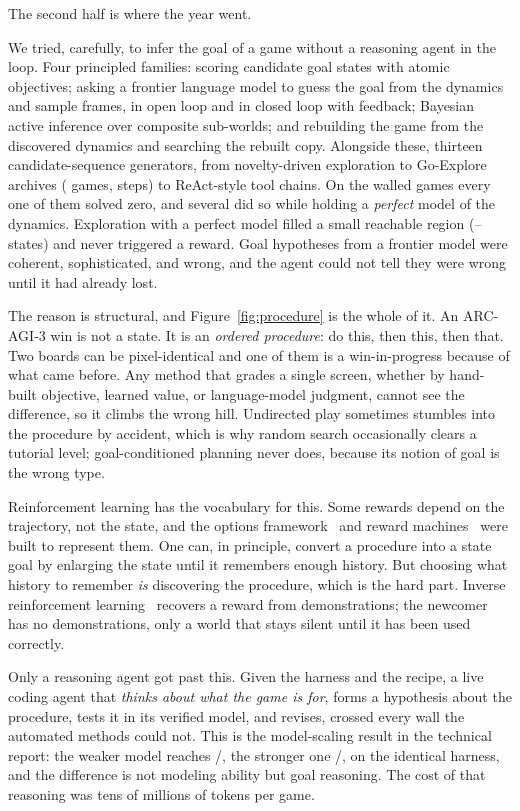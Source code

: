\documentclass[11pt]{article}
\begin{document}
The second half is where the year went.

We tried, carefully, to infer the goal of a game without a reasoning agent in the loop. Four principled
families: scoring candidate goal states with atomic objectives; asking a frontier language model to guess
the goal from the dynamics and sample frames, in open loop and in closed loop with feedback; Bayesian
active inference over composite sub-worlds; and rebuilding the game from the discovered dynamics and
searching the rebuilt copy. Alongside these, thirteen candidate-sequence generators, from novelty-driven
exploration to Go-Explore archives (\ArcGoExploreN{} games, \ArcGoExploreSteps{} steps) to ReAct-style
tool chains. On the walled games every one of them solved zero, and several did so while holding a
\emph{perfect} model of the dynamics. Exploration with a perfect model filled a small reachable region
(\ArcExploreLo{}--\ArcExploreHi{} states) and never triggered a reward. Goal hypotheses from a frontier
model were coherent, sophisticated, and wrong, and the agent could not tell they were wrong until it had
already lost.

The reason is structural, and Figure~\ref{fig:procedure} is the whole of it. An ARC-AGI-3 win is not a
state. It is an \emph{ordered procedure}: do this, then this, then that. Two boards can be pixel-identical
and one of them is a win-in-progress because of what came before. Any method that grades a single screen,
whether by hand-built objective, learned value, or language-model judgment, cannot see the difference,
so it climbs the wrong hill. Undirected play sometimes stumbles into the procedure by accident, which is
why random search occasionally clears a tutorial level; goal-conditioned planning never does, because its
notion of goal is the wrong type.

Reinforcement learning has the vocabulary for this. Some rewards depend on the trajectory, not the state,
and the options framework~\cite{sutton1999options} and reward machines~\cite{icarte2018reward} were
built to represent them. One can, in principle, convert a procedure into a state goal by enlarging the
state until it remembers enough history. But choosing what history to remember \emph{is} discovering the
procedure, which is the hard part. Inverse reinforcement learning~\cite{ng2000inverse} recovers a reward
from demonstrations; the newcomer has no demonstrations, only a world that stays silent until it has been
used correctly.

Only a reasoning agent got past this. Given the harness and the recipe, a live coding agent that
\emph{thinks about what the game is for}, forms a hypothesis about the procedure, tests it in its verified
model, and revises, crossed every wall the automated methods could not. This is the model-scaling result
in the technical report: the weaker model reaches \ArcSFGames/\ArcUnionGames{}, the stronger one
\ArcFableFull/\ArcUnionGames{}, on the identical harness, and the difference is not modeling ability but
goal reasoning. The cost of that reasoning was tens of millions of tokens per game.
\end{document}
